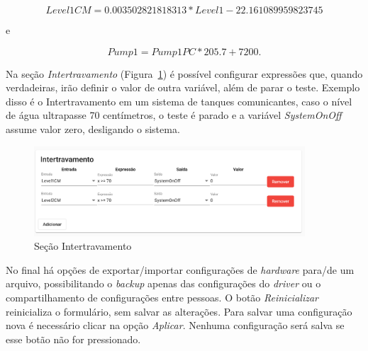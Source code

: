 \begin{equation*}
    Level1CM = 0.003502821818313*Level1 -22.161089959823745
\end{equation*}

e

\begin{equation*}
    Pump1 = Pump1PC * 205.7 + 7200.
\end{equation*}

Na seção \textit{Intertravamento} (Figura~\ref{fig:hardware5}) é possível
configurar expressões que, quando verdadeiras, irão definir o valor de outra
variável, além de parar o teste. Exemplo disso é o Intertravamento em um sistema
de tanques comunicantes, caso o nível de água ultrapasse 70 centímetros, o teste
é parado e a variável \textit{SystemOnOff} assume valor zero, desligando o
sistema.

\begin{figure}[ht!]
    \centering
    \includegraphics[width=0.9\textwidth]{imgs/hardware5}
    \caption[Seção Intertravamento]{Seção Intertravamento}%
    \label{fig:hardware5}
\end{figure}

No final há opções de exportar/importar configurações de \textit{hardware}
para/de um arquivo, possibilitando o \textit{backup} apenas das configurações do
\textit{driver} ou o compartilhamento de configurações entre pessoas. O botão
\textit{Reinicializar} reinicializa o formulário, sem salvar as alterações. Para
salvar uma configuração nova é necessário clicar na opção \textit{Aplicar}.
Nenhuma configuração será salva se esse botão não for pressionado.
